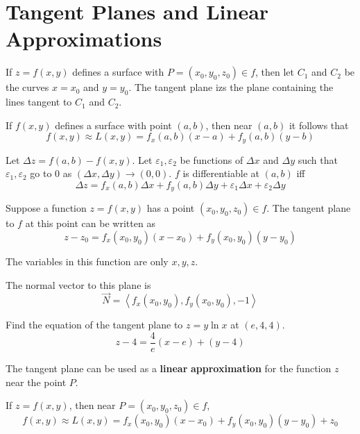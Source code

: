 \section{Tangent Planes and Linear Approximations}
\begin{definition}
    If \(z=f(x,y)\) defines a surface with \(P=(x_0,y_0,z_0 )\in f\), then let \(C_1\) and \(C_2\) be the curves \(x=x_0\) and \(y=y_0\). The tangent plane izs the plane containing the lines tangent to \(C_1\) and \(C_2\).
\end{definition}
\begin{definition}[Linearization]
    If \(f(x,y)\) defines a surface with point \((a,b)\), then near \((a,b)\) it follows that
    \[
        f(x,y)\approx L(x,y)=f_x(a,b)(x-a)+f_y (a,b)(y-b)
    \]
\end{definition}
\begin{definition}
    Let \(\Delta z=f(a,b)-f(x,y)\). Let \(\varepsilon _1,\varepsilon _2\) be functions of \(\Delta x\) and \(\Delta y\) such that \(\varepsilon _1,\varepsilon _2\) go to 0 as \((\Delta x,\Delta y)\to (0,0)\). \(f\) is differentiable at \((a,b)\) iff 
    \[
        \Delta z=f_x (a,b)\Delta x+f_y (a,b)\Delta y+\varepsilon _1\Delta x+\varepsilon _2 \Delta y
    \]
\end{definition}
\begin{definition}
    Suppose a function \(z=f(x,y)\) has a point \((x_0,y_0,z_0)\in f\). The tangent plane to \(f\) at this point can be written as 
\[
    z-z_0 =f_x (x_0,y_0)(x-x_0)+f_y (x_0,y_0)(y-y_0)
\]
\end{definition}
\begin{remark}
    The variables in this function are only \(x,y,z\).
\end{remark}
\begin{corollary}
    The normal vector to this plane is 
    \[
        \vec{N}=\left\langle f_x (x_0,y_0),f_y(x_0,y_0),-1 \right\rangle 
    \]
\end{corollary}
\begin{eg}
    Find the equation of the tangent plane to \(z=y\ln x\) at \((e,4,4)\).
    \[
        z-4=\frac{4}{e}(x-e)+(y-4)
    \]
\end{eg}
The tangent plane can be used as a \textbf{linear} \textbf{approximation} for the function \(z\) near the point \(P\).
\begin{definition}[Linearization]
    If \(z=f(x,y)\), then near \(P=(x_0,y_0,z_0)\in f\), 
    \[f(x,y)\approx L(x,y)=f_x (x_0,y_0)(x-x_0)+f_y(x_0,y_0)(y-y_0)+z_0\]
\end{definition}
